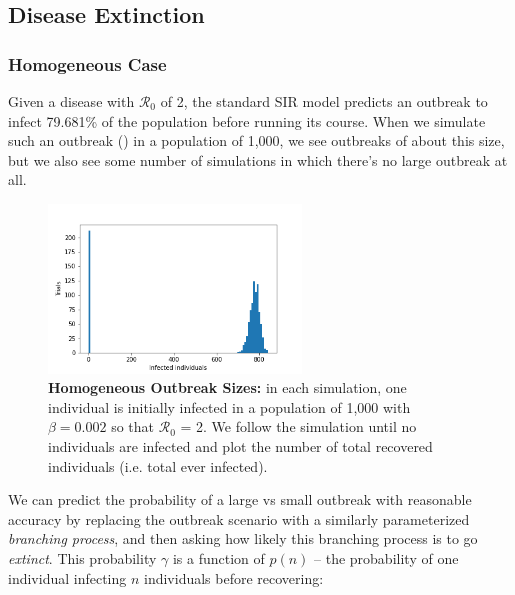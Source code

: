 \documentclass{article}
\begin{document}
\subsection{Disease Extinction}

\subsubsection{Homogeneous Case}

Given a disease with $\mathcal{R}_0$ of 2, the standard SIR model predicts an
outbreak to infect 79.681\% of the population before running its course.
When we simulate such an outbreak () in
a population of 1,000, we see outbreaks of about this size, 
but we also see some number of simulations in which there's no large outbreak at all.\\

\begin{figure}
\centering
\includegraphics[width=0.6\textwidth]{extinction_histogram}
\caption{\textbf{Homogeneous Outbreak Sizes:} in each simulation, one individual
is initially  infected in a population of 1,000 with $\beta = 0.002$ so that
$\mathcal{R}_0$ = 2. We follow the simulation until no individuals are infected
and plot the number of total recovered individuals (i.e. total ever infected).} 
\label{fig:extinction_histogram}
\end{figure}



We can predict the probability of a large vs small outbreak with reasonable
accuracy by replacing the outbreak scenario with a similarly parameterized
\textit{branching process}, and then asking how likely this branching process
is to go \textit{extinct}. This probability $\gamma$ is a function of
$p(n)$ – the probability of one individual infecting $n$ individuals before recovering:
\end{document}
